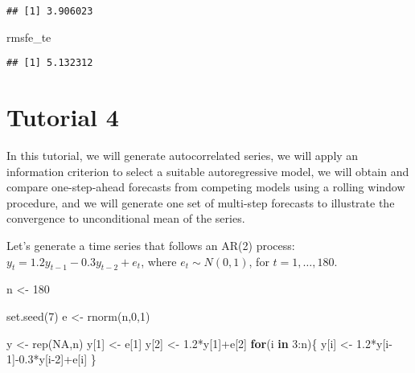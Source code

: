 \documentclass[
  oneside]{book}
\newenvironment{Shaded}{\begin{snugshade}}{\end{snugshade}}
\newcommand{\ConstantTok}[1]{\textcolor[rgb]{0.00,0.00,0.00}{#1}}
\newcommand{\ControlFlowTok}[1]{\textcolor[rgb]{0.13,0.29,0.53}{\textbf{#1}}}
\newcommand{\DecValTok}[1]{\textcolor[rgb]{0.00,0.00,0.81}{#1}}
\newcommand{\FloatTok}[1]{\textcolor[rgb]{0.00,0.00,0.81}{#1}}
\newcommand{\FunctionTok}[1]{\textcolor[rgb]{0.00,0.00,0.00}{#1}}
\newcommand{\NormalTok}[1]{#1}
\newcommand{\OtherTok}[1]{\textcolor[rgb]{0.56,0.35,0.01}{#1}}
\newcommand{\SpecialCharTok}[1]{\textcolor[rgb]{0.00,0.00,0.00}{#1}}
\begin{document}
\begin{verbatim}
## [1] 3.906023
\end{verbatim}

\begin{Shaded}
\begin{Highlighting}[]
\NormalTok{rmsfe\_te}
\end{Highlighting}
\end{Shaded}

\begin{verbatim}
## [1] 5.132312
\end{verbatim}

\hypertarget{tutorial-4}{%
\chapter*{Tutorial 4}\label{tutorial-4}}

In this tutorial, we will generate autocorrelated series, we will apply an information criterion to select a suitable autoregressive model, we will obtain and compare one-step-ahead forecasts from competing models using a rolling window procedure, and we will generate one set of multi-step forecasts to illustrate the convergence to unconditional mean of the series.

Let's generate a time series that follows an AR(2) process: \(y_{t} = 1.2y_{t-1}-0.3y_{t-2}+e_{t}\), where \(e_{t} \sim N(0,1)\), for \(t=1,\ldots,180\).

\begin{Shaded}
\begin{Highlighting}[]
\NormalTok{n }\OtherTok{\textless{}{-}} \DecValTok{180}

\FunctionTok{set.seed}\NormalTok{(}\DecValTok{7}\NormalTok{)}
\NormalTok{e }\OtherTok{\textless{}{-}} \FunctionTok{rnorm}\NormalTok{(n,}\DecValTok{0}\NormalTok{,}\DecValTok{1}\NormalTok{)}

\NormalTok{y }\OtherTok{\textless{}{-}} \FunctionTok{rep}\NormalTok{(}\ConstantTok{NA}\NormalTok{,n)}
\NormalTok{y[}\DecValTok{1}\NormalTok{] }\OtherTok{\textless{}{-}}\NormalTok{ e[}\DecValTok{1}\NormalTok{]}
\NormalTok{y[}\DecValTok{2}\NormalTok{] }\OtherTok{\textless{}{-}} \FloatTok{1.2}\SpecialCharTok{*}\NormalTok{y[}\DecValTok{1}\NormalTok{]}\SpecialCharTok{+}\NormalTok{e[}\DecValTok{2}\NormalTok{]}
\ControlFlowTok{for}\NormalTok{(i }\ControlFlowTok{in} \DecValTok{3}\SpecialCharTok{:}\NormalTok{n)\{}
\NormalTok{  y[i] }\OtherTok{\textless{}{-}} \FloatTok{1.2}\SpecialCharTok{*}\NormalTok{y[i}\DecValTok{{-}1}\NormalTok{]}\SpecialCharTok{{-}}\FloatTok{0.3}\SpecialCharTok{*}\NormalTok{y[i}\DecValTok{{-}2}\NormalTok{]}\SpecialCharTok{+}\NormalTok{e[i]}
\NormalTok{\}}
\end{Highlighting}
\end{Shaded}
\end{document}
